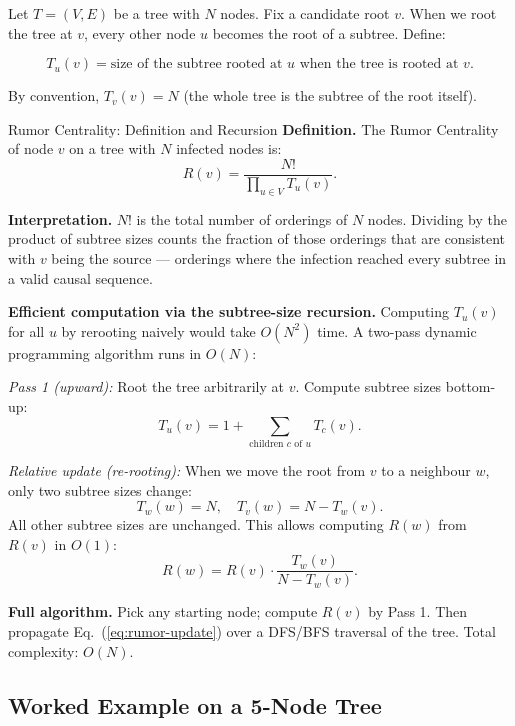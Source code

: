 Let $T = (V, E)$ be a tree with $N$ nodes. Fix a candidate root $v$. When we root the
tree at $v$, every other node $u$ becomes the root of a subtree. Define:

\begin{equation}
  T_u(v) = \text{size of the subtree rooted at } u \text{ when the tree is rooted at } v.
  \label{eq:subtree-size}
\end{equation}

By convention, $T_v(v) = N$ (the whole tree is the subtree of the root itself).

\begin{mathbox}{Rumor Centrality: Definition and Recursion}
\textbf{Definition.} The Rumor Centrality of node $v$ on a tree with $N$ infected
nodes is:
\begin{equation}
  R(v) = \frac{N!}{\prod_{u \in V} T_u(v)}.
  \label{eq:rumor}
\end{equation}

\textbf{Interpretation.} $N!$ is the total number of orderings of $N$ nodes. Dividing
by the product of subtree sizes counts the fraction of those orderings that are
consistent with $v$ being the source --- orderings where the infection reached every
subtree in a valid causal sequence.

\textbf{Efficient computation via the subtree-size recursion.}
Computing $T_u(v)$ for all $u$ by rerooting naively would take $O(N^2)$ time.
A two-pass dynamic programming algorithm runs in $O(N)$:

\textit{Pass 1 (upward):} Root the tree arbitrarily at $v$. Compute subtree sizes
bottom-up:
\[
  T_u(v) = 1 + \sum_{\text{children } c \text{ of } u} T_c(v).
\]

\textit{Relative update (re-rooting):} When we move the root from $v$ to a neighbour
$w$, only two subtree sizes change:
\[
  T_w(w) = N, \quad T_v(w) = N - T_w(v).
\]
All other subtree sizes are unchanged. This allows computing $R(w)$ from $R(v)$ in
$O(1)$:
\begin{equation}
  R(w) = R(v) \cdot \frac{T_w(v)}{N - T_w(v)}.
  \label{eq:rumor-update}
\end{equation}

\textbf{Full algorithm.} Pick any starting node; compute $R(v)$ by Pass 1. Then
propagate Eq.~(\ref{eq:rumor-update}) over a DFS/BFS traversal of the tree. Total
complexity: $O(N)$.
\end{mathbox}

\subsection{Worked Example on a 5-Node Tree}

